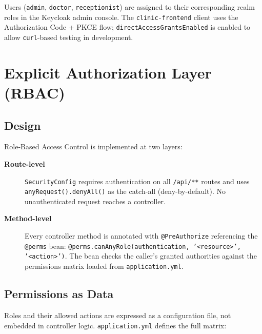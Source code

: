 \documentclass[12pt,a4paper]{report}
\begin{document}
Users (\texttt{admin}, \texttt{doctor}, \texttt{receptionist}) are assigned to their
corresponding realm roles in the Keycloak admin console. The \texttt{clinic-frontend} client
uses the Authorization Code + PKCE flow; \texttt{directAccessGrantsEnabled} is enabled to
allow \texttt{curl}-based testing in development.

\section{Explicit Authorization Layer (RBAC)}

\subsection{Design}

Role-Based Access Control is implemented at two layers:

\begin{description}
  \item[\textbf{Route-level}] \texttt{SecurityConfig} requires authentication on all
    \texttt{/api/**} routes and uses \texttt{anyRequest().denyAll()} as the catch-all
    (deny-by-default). No unauthenticated request reaches a controller.
  \item[\textbf{Method-level}] Every controller method is annotated with
    \texttt{@PreAuthorize} referencing the \texttt{@perms} bean:
    \texttt{@perms.canAnyRole(authentication,\allowbreak{} '<resource>',\allowbreak{} '<action>')}.
    The bean checks the caller's granted authorities against the permissions matrix
    loaded from \texttt{application.yml}.
\end{description}

\subsection{Permissions as Data}

Roles and their allowed actions are expressed as a configuration file, not embedded in
controller logic. \texttt{application.yml} defines the full matrix:
\end{document}
